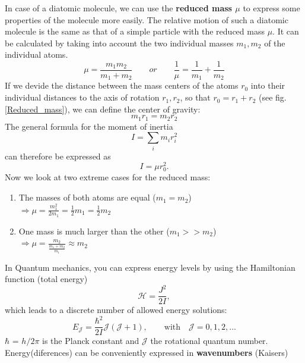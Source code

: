 \documentclass[a4paper,fleqn]{article}
\begin{document}
In case of a diatomic molecule, we can use the \textbf{reduced mass $\mu$} to express some properties of the molecule more easily. The relative motion of such a diatomic molecule is the same as that of a simple particle with the reduced mass $\mu$. It can be calculated by taking into account the two individual masses $m_1, m_2$ of the individual atoms.
\begin{equation}
\mu = \frac{m_1 m_2}{m_1+m_2} \qquad or \qquad \frac{1}{\mu} = \frac{1}{m_1} + \frac{1}{m_2}
\end{equation}
If we devide the distance between the mass centers of the atoms $r_0$ into their individual distances to the axis of rotation $r_1, r_2$, so that $r_0 = r_1 + r_2$ (see fig. \ref{Reduced_mass}), we can define the center of gravity:
\begin{equation*}
m_1 r_1 = m_2 r_2
\end{equation*}
The general formula for the moment of inertia 
\begin{equation*}
I = \sum_i m_i r_i^2 
\end{equation*}
can therefore be expressed as 
\begin{equation}
I = \mu r_0^2.
\end{equation}
Now we look at two extreme cases for the reduced mass:
\begin{enumerate}
\item The masses of both atoms are equal ($m_1 = m_2$) \\
  $\Rightarrow \mu = \frac{m_1^2}{2m_1} = \frac{1}{2}m_1 = \frac{1}{2}m_2$
\item One mass is much larger than the other ($m_1 >> m_2$) \\
  $\Rightarrow \mu = \frac{m_2}{\frac{m_1 + m_2}{m_1}} \approx m_2$ 
\end{enumerate}
In Quantum mechanics, you can express energy levels by using the Hamiltonian function (total energy)
\begin{equation}
\mathcal{H}=\frac{J^2}{2I},
\end{equation}
which leads to a discrete number of allowed energy solutions:
\begin{equation}
E_\mathcal{J} = \frac{\hbar^2}{2I} \mathcal{J}(\mathcal{J}+1), \qquad \text{with} \quad \mathcal{J} = 0, 1, 2, ...
\end{equation}
$\hbar$ = $h/2\pi$ is the Planck constant and $\mathcal{J}$ the rotational quantum number. \\
Energy(diferences) can be conveniently expressed in \textbf{wavenumbers} (Kaisers)
\end{document}

